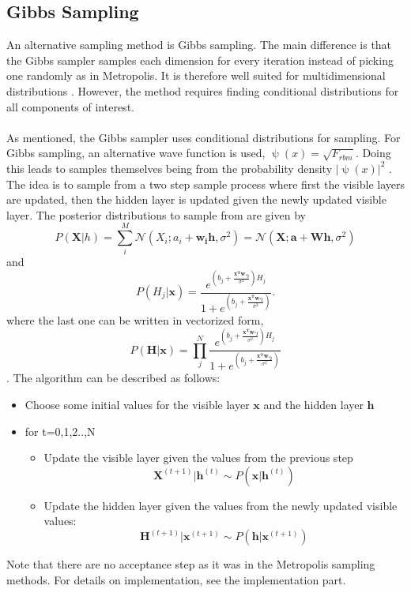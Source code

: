 \subsection{Gibbs Sampling}
An alternative sampling method is Gibbs sampling. The main difference is that the Gibbs sampler samples each dimension for every iteration instead of picking one randomly as in Metropolis. It is therefore well suited for multidimensional distributions \cite{compstat}. However, the method requires finding conditional distributions for all components of interest. 
\\
\\
As mentioned, the Gibbs sampler uses conditional distributions for sampling. For Gibbs sampling, an alternative wave function is used, $\uppsi(x) = \sqrt{F_{rbm}}$. Doing this leads to samples themselves being from the probability density $ |\uppsi(x)|^2$ \cite{extext}. The idea is to sample from a two step sample process where first the visible layers are updated, then the hidden layer is updated given the newly updated visible layer. The posterior distributions to sample from are given by
\begin{equation}
    P(\boldsymbol{X}|h) = \sum_i^M \mathcal{N}(X_i; a_i + \boldsymbol{w_ih}, \sigma^2) = \mathcal{N}(\boldsymbol{X};\boldsymbol{a} + \boldsymbol{Wh}, \sigma^2)
\end{equation}
and 
\begin{equation}
    P(H_j|\boldsymbol{x}) = \frac{e^{\left(b_j + \frac{\boldsymbol{x^Tw_{*j}}}{\sigma^2}\right)H_j}}{1 + e^{\left(b_j + \frac{\boldsymbol{x^Tw_{*j}}}{\sigma^2}\right)}}.
\end{equation}
where the last one can be written in vectorized form, 
\begin{equation}
    P(\boldsymbol{H}|\boldsymbol{x}) = \prod_j^N \frac{e^{\left(b_j + \frac{\boldsymbol{x^Tw_{*j}}}{\sigma^2}\right)H_j}}{1 + e^{\left(b_j + \frac{\boldsymbol{x^Tw_{*j}}}{\sigma^2}\right)}}
\end{equation} \cite{extext}.
The algorithm can be described as follows:
\begin{itemize}
    \item Choose some initial values for the visible layer $\boldsymbol{x}$ and the hidden layer $\boldsymbol{h}$
    \item for t=0,1,2..,N
    \begin{itemize}
        \item Update the visible layer given the values from the previous step
        \begin{equation}
            \boldsymbol{X}^{(t+1)}|\boldsymbol{h}^{(t)} \sim P(\boldsymbol{x}|\boldsymbol{h}^{(t)})
        \end{equation}
        \item Update the hidden layer given the values from the newly updated visible values: 
        \begin{equation}
            \boldsymbol{H}^{(t+1)}|\boldsymbol{x}^{(t+1)}  \sim P(\boldsymbol{h}|\boldsymbol{x}^{(t+1)})
        \end{equation}
        
    \end{itemize}
\end{itemize}
Note that there are no acceptance step as it was in the Metropolis sampling methods. For details on implementation, see the implementation part. 